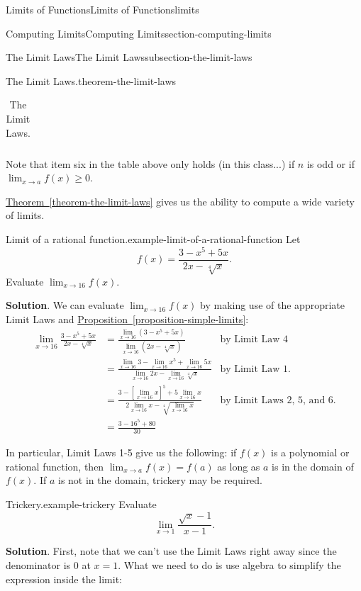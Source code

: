 \documentclass[oneside,10pt,]{book}
\numberwithin{equation}{section}
\begin{document}
\begin{chapterptx}{Limits of Functions}{}{Limits of Functions}{}{}{limits}
\begin{sectionptx}{Computing Limits}{}{Computing Limits}{}{}{section-computing-limits}
\begin{subsectionptx}{The Limit Laws}{}{The Limit Laws}{}{}{subsection-the-limit-laws}
\begin{theorem}{The Limit Laws.}{}{theorem-the-limit-laws}
\begin{table}
\begin{tabular}{ll}
\end{tabular}
\caption{The Limit Laws.\label{table-limit-laws}}
\end{table}
\hypertarget{p-23}{}%
Note that item six in the table above only holds (in this class...) if \(n\) is odd or if \(\lim_{x\to a}f(x)\geq0\).%
\end{theorem}
\hypertarget{p-24}{}%
\hyperref[theorem-the-limit-laws]{Theorem~\ref{theorem-the-limit-laws}} gives us the ability to compute a wide variety of limits.%
\begin{example}{Limit of a rational function.}{example-limit-of-a-rational-function}%
\hypertarget{p-25}{}%
Let%
\begin{equation*}
f(x) = \frac{3 - x^{5} + 5x}{2x-\sqrt[4]{x}}.
\end{equation*}
Evaluate \(\lim_{x\to 16}f(x)\).%
\par\smallskip%
\noindent\textbf{Solution}.\hypertarget{solution-4}{}\quad%
\hypertarget{p-26}{}%
We can evaluate \(\lim_{x\to 16}f(x)\) by making use of the appropriate Limit Laws and \hyperref[proposition-simple-limits]{Proposition~\ref{proposition-simple-limits}}:%
%
\begin{align*}
\lim_{x\to 16}\frac{3 - x^{5} + 5x}{2x-\sqrt[4]{x}} & = \frac{\lim_{x\to 16}(3 - x^{5} + 5x)}{\lim_{x\to 16}(2x-\sqrt[4]{x})} & \text{by Limit Law 4}\\
& = \frac{\lim_{x\to 16}3 - \lim_{x\to 16}x^{5} + \lim_{x\to 16}5x}{\lim_{x\to 16}2x-\lim_{x\to 16}\sqrt[4]{x}} & \text{by Limit Law 1.} \\
& = \frac{3 - [\lim_{x\to 16}x]^{5} + 5\lim_{x\to 16}x}{2\lim_{x\to 16}x-\sqrt[4]{\lim_{x\to 16}x}} & \text{by Limit Laws 2, 5, and 6.} \\
& = \frac{3-16^{5}+80}{30} &
\end{align*}
\end{example}
\hypertarget{p-27}{}%
In particular, Limit Laws 1-5 give us the following: if \(f(x)\) is a polynomial or rational function, then \(\lim_{x\to a}f(x) = f(a)\) as long as \(a\) is in the domain of \(f(x)\). If \(a\) is not in the domain, trickery may be required.%
\begin{example}{Trickery.}{example-trickery}%
\hypertarget{p-28}{}%
Evaluate%
\begin{equation*}
\lim_{x\to1}\frac{\sqrt{x}-1}{x-1}.
\end{equation*}
%
\par\smallskip%
\noindent\textbf{Solution}.\hypertarget{solution-5}{}\quad%
\hypertarget{p-29}{}%
First, note that we can't use the Limit Laws right away since the denominator is \(0\) at \(x=1\). What we need to do is use algebra to simplify the expression inside the limit:%

\end{example}
\end{subsectionptx}
\end{sectionptx}
\end{chapterptx}
\end{document}
